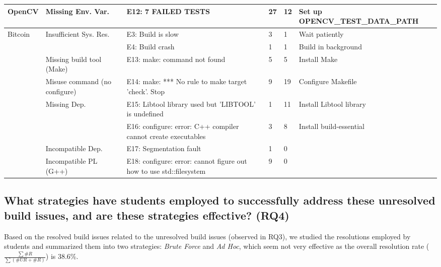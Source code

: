 \documentclass[10pt, conference]{IEEEtran}
\begin{document}
\begin{table*}[htbp]
{\begin{tabular}{lp{13em}p{40em}llr}
    \midrule
    \multicolumn{1}{p{5.355em}}{OpenCV} & \multicolumn{1}{l}{Missing Env. Var.} & E12: 7 FAILED TESTS & 27    & 12    & \multicolumn{1}{l}{Set up OPENCV\_TEST\_DATA\_PATH} \\
    \midrule
    \multicolumn{1}{p{5.355em}}{Bitcoin} & \multicolumn{1}{l}{Insufficient Sys. Res.} & E3: Build is slow & 3     & 1     & \multicolumn{1}{l}{Wait patiently} \\
          & \multicolumn{1}{l}{} & E4: Build crash & 1     & 1     & \multicolumn{1}{l}{Build in background } \\
\cmidrule{2-6}          & Missing build tool (Make) & E13: make: command not found & 5     & 5     & \multicolumn{1}{l}{Install Make} \\
\cmidrule{2-6}          & Misuse command (no configure) & E14: make: *** No rule to make target 'check'.  Stop & 9     & 19    & \multicolumn{1}{l}{Configure Makefile} \\
\cmidrule{2-6}          & \multicolumn{1}{l}{Missing Dep.} & E15: Libtool library used but 'LIBTOOL' is undefined & 1     & 11    & \multicolumn{1}{l}{Install Libtool library } \\
          & \multicolumn{1}{l}{} & E16: configure: error: C++ compiler cannot create executables & 3     & 8     & \multicolumn{1}{l}{Install build-essential} \\
\cmidrule{2-6}          & \multicolumn{1}{l}{Incompatible Dep.} & E17: Segmentation fault & 1     & 0     &  \\
\cmidrule{2-6}          & Incompatible PL (G++) & E18: configure: error: cannot figure out how to use std::filesystem & 9     & 0     &  \\
    \bottomrule
    \end{tabular}}%
  \label{tab:strategy}%
  \vspace{-.4cm}
\end{table*}%

\subsection{What strategies have students employed to successfully address these unresolved build issues, and are these strategies effective? (RQ4)}
\label{sec:RQ4}
Based on the resolved build issues related to the unresolved build issues (observed in RQ3),  we studied the resolutions employed by students and summarized them into two strategies:  \textit{Brute Force} and \textit{Ad Hoc}, which seem not very effective as the overall resolution rate ($\frac{\sum \#R}{\sum (\#UR+\#R)}$) is  38.6\%.
\end{document}
